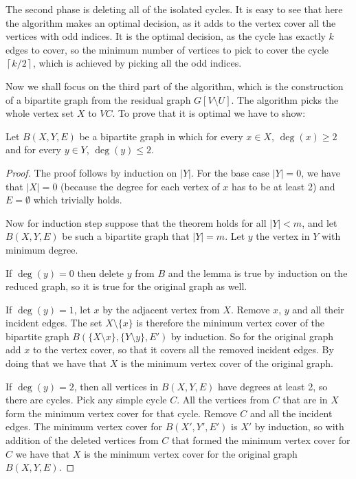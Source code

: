  The second phase is deleting all of the isolated cycles. It is easy to see that 
here the algorithm makes an optimal decision, as it adds to the vertex cover all the
vertices with odd indices. It is the optimal decision, as the cycle has exactly $k$ edges
to cover, so the minimum number of vertices to pick to cover the cycle 
$\left \lceil{k/2}\right \rceil $, which is achieved by picking all the odd indices.


Now we shall focus on the third part of the algorithm, which is the construction of 
a bipartite graph from the residual graph $G[V \setminus U]$. The algorithm picks the whole
vertex set $X$ to $VC$. To prove that it is optimal we have to show:
\begin{lemma} \label{lem:vc-bipartie}
    Let $B(X, Y, E)$ be a bipartite graph in which for every $x \in X$, $\deg(x) \geq 2$ and 
    for every $y \in Y$, $\deg(y) \leq 2$.
\end{lemma}
\begin{proof}
    The proof follows by induction on $|Y|$. For the base case $|Y| = 0$, we have that $|X| = 0$
    (because the degree for each vertex of $x$ has to be at least 2) and $E = \emptyset$ which 
    trivially holds.

    Now for induction step suppose that the theorem holds for all $|Y| < m$, and let $B(X, Y, E)$
    be such a bipartite graph that $|Y| = m$. Let $y$ the vertex in $Y$ with minimum degree.

    If $\deg(y) = 0$ then delete $y$ from $B$ and the lemma is true by induction on the reduced graph, 
    so it is true for the original graph as well.

    If $\deg(y) = 1$, let $x$ by the adjacent vertex from $X$.
    Remove $x$, $y$ and all their incident edges. The set $X \setminus \{x\}$ is therefore the 
    minimum vertex cover of the bipartite graph $B(\{X \setminus x\}, \{Y \setminus y\}, E')$ by induction.
    So for the original graph add $x$ to the vertex cover, so that it covers all the removed incident edges.
    By doing that we have that $X$ is the minimum vertex cover of the original graph.

    If $\deg(y) = 2$, then 
    all vertices in $B(X, Y, E)$ have degrees at least 2, so there are cycles. Pick any simple cycle $C$. All the 
    vertices from $C$ that are in $X$ form the minimum vertex cover for that cycle. Remove $C$ and all the incident 
    edges. The minimum vertex cover for $B(X', Y', E')$ is $X'$ by induction, so with addition of the deleted 
    vertices from $C$ that formed the minimum vertex cover for $C$ we have that $X$ is the minimum vertex cover for
    the original graph $B(X, Y, E)$.
\end{proof}

